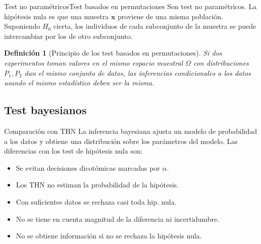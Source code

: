 \documentclass[leqno]{beamer}
\theoremstyle{definition_wo_parentheses}
\newtheorem{definicion}{Definición}
\begin{document}

\begin{frame}{Test no paramétricos}{Test basados en permutaciones}
	Son test no paramétricos. La hipótesis nula es que una muestra $\mathbf{x}$ proviene de una misma población.\\
	Suponiendo $H_0$ cierta, los individuos de cada 
subconjunto de la muestra se puede intercambiar por los de 
otro subconjunto.
\begin{definicion}[Principio de los test basados en permutaciones] Si dos experimentos toman valores en el mismo
espacio muestral $\Omega$ con distribuciones $P_1, P_2$ dan
el mismo conjunto de datos, las inferencias condicionales
a los datos usando el mismo estadístico deben ser la misma.
\end{definicion}
\end{frame}


\subsection{Test bayesianos}
\begin{frame}{Comparación con THN}
	La inferencia bayesiana ajusta un modelo de probabilidad
a los datos y obtiene una distribución sobre los parámetros
del modelo. Las diferencias con los test de hipótesis nula son:

\begin{itemize}
\item Se evitan decisiones dicotómicas marcadas por $\alpha$.
\item Los THN no estiman la probabilidad de la hipótesis.
\item Con suficientes datos se rechaza casi toda hip. nula.
\item No se tiene en cuenta magnitud de la diferencia ni incertidumbre.
\item No se obtiene información si no se rechaza la hipótesis nula.
\end{itemize}

\end{frame}

\end{document}
